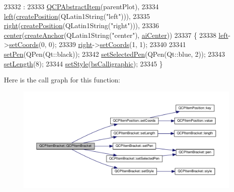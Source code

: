 \begin{DoxyCode}
23332                                                       :
23333   \hyperlink{class_q_c_p_abstract_item_a9922507d8b4503a1fe1ed0b1030e23b6}{QCPAbstractItem}(parentPlot),
23334   \hyperlink{class_q_c_p_item_bracket_af6cc6d27d96171778c6927d6edce48b0}{left}(\hyperlink{class_q_c_p_abstract_item_a75036d39c4d4e2e1a7dd145fff915d32}{createPosition}(QLatin1String(\textcolor{stringliteral}{"left"}))),
23335   \hyperlink{class_q_c_p_item_bracket_afa6c1360b05a50c4e0df37b3cebab6be}{right}(\hyperlink{class_q_c_p_abstract_item_a75036d39c4d4e2e1a7dd145fff915d32}{createPosition}(QLatin1String(\textcolor{stringliteral}{"right"}))),
23336   \hyperlink{class_q_c_p_item_bracket_a2dbcabdf5f467f28be12a7b25962ffca}{center}(\hyperlink{class_q_c_p_abstract_item_af3fc92527802078ca395138748b629a7}{createAnchor}(QLatin1String(\textcolor{stringliteral}{"center"}), \hyperlink{class_q_c_p_item_bracket_a7f3a6a56d67f71219ed220553f3dd861a17b57ef34cc05eadfe9becd1ad5b5242}{aiCenter}))
23337 \{
23338   \hyperlink{class_q_c_p_item_bracket_af6cc6d27d96171778c6927d6edce48b0}{left}->\hyperlink{class_q_c_p_item_position_aa988ba4e87ab684c9021017dcaba945f}{setCoords}(0, 0);
23339   \hyperlink{class_q_c_p_item_bracket_afa6c1360b05a50c4e0df37b3cebab6be}{right}->\hyperlink{class_q_c_p_item_position_aa988ba4e87ab684c9021017dcaba945f}{setCoords}(1, 1);
23340   
23341   \hyperlink{class_q_c_p_item_bracket_ab13001d9cc5d8f9e56ea15bdda682acb}{setPen}(QPen(Qt::black));
23342   \hyperlink{class_q_c_p_item_bracket_a349785c31122778a520c64891fa204c5}{setSelectedPen}(QPen(Qt::blue, 2));
23343   \hyperlink{class_q_c_p_item_bracket_ac7cfc3da7da9b5c5ac5dfbe4f0351b2a}{setLength}(8);
23344   \hyperlink{class_q_c_p_item_bracket_a612dffa2373422eef8754d690add3703}{setStyle}(\hyperlink{class_q_c_p_item_bracket_a7ac3afd0b24a607054e7212047d59dbda8f29f5ef754e2dc9a9efdedb2face0f3}{bsCalligraphic});
23345 \}
\end{DoxyCode}


Here is the call graph for this function\+:\nopagebreak
\begin{figure}[H]
\begin{center}
\leavevmode
\includegraphics[width=350pt]{class_q_c_p_item_bracket_a44ecfa37a76de5e3549e2d61f9d8ee56_cgraph}
\end{center}
\end{figure}


